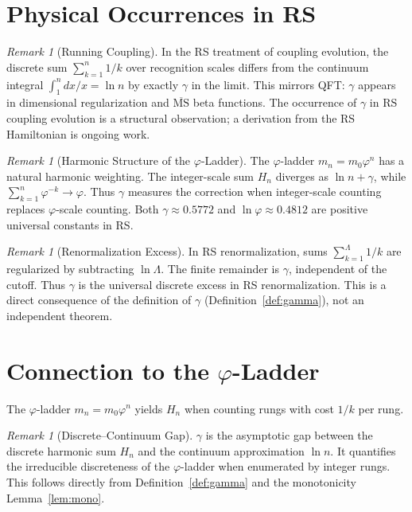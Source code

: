 \documentclass[12pt,a4paper]{article}
\theoremstyle{definition}
\theoremstyle{remark}
\newtheorem{remark}[theorem]{Remark}
\begin{document}
\section{Physical Occurrences in RS}
\label{sec:physical}

\begin{remark}[Running Coupling]
\label{thm:running}
In the RS treatment of coupling evolution, the discrete sum
$\sum_{k=1}^n 1/k$ over recognition scales differs from the
continuum integral $\int_1^n dx/x = \ln n$ by exactly $\gamma$ in
the limit.  This mirrors QFT: $\gamma$ appears in dimensional
regularization and $\overline{\mathrm{MS}}$ beta functions.  The
occurrence of $\gamma$ in RS coupling evolution is a structural
observation; a derivation from the RS Hamiltonian is ongoing work.
\end{remark}

\begin{remark}[Harmonic Structure of the $\varphi$-Ladder]
\label{thm:ladder-harmonic}
The $\varphi$-ladder $m_n = m_0 \varphi^n$ has a natural harmonic
weighting.  The integer-scale sum $H_n$ diverges as $\ln n + \gamma$,
while $\sum_{k=1}^n \varphi^{-k} \to \varphi$.  Thus $\gamma$
measures the correction when integer-scale counting replaces
$\varphi$-scale counting.  Both $\gamma \approx 0.5772$ and
$\ln\varphi \approx 0.4812$ are positive universal constants in RS.
\end{remark}

\begin{remark}[Renormalization Excess]
\label{thm:renorm}
In RS renormalization, sums $\sum_{k=1}^\Lambda 1/k$ are regularized
by subtracting $\ln\Lambda$.  The finite remainder is $\gamma$,
independent of the cutoff.  Thus $\gamma$ is the universal discrete
excess in RS renormalization.  This is a direct consequence of the
definition of $\gamma$ (Definition~\ref{def:gamma}), not an
independent theorem.
\end{remark}

\section{Connection to the $\varphi$-Ladder}
\label{sec:phi-ladder}

The $\varphi$-ladder $m_n = m_0 \varphi^n$ yields $H_n$ when counting
rungs with cost $1/k$ per rung.

\begin{remark}[Discrete--Continuum Gap]
\label{thm:gap}
$\gamma$ is the asymptotic gap between the discrete harmonic sum
$H_n$ and the continuum approximation $\ln n$.  It quantifies the
irreducible discreteness of the $\varphi$-ladder when enumerated by
integer rungs.  This follows directly from
Definition~\ref{def:gamma} and the monotonicity
Lemma~\ref{lem:mono}.
\end{remark}
\end{document}
